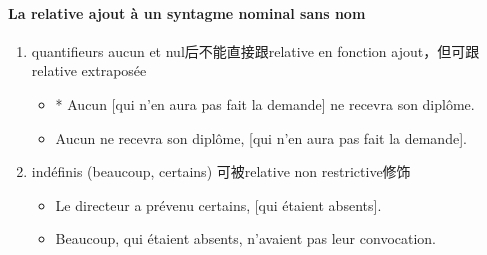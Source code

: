 \documentclass[UTF8]{report}
\begin{document}
\paragraph{La relative ajout à un syntagme nominal sans nom}
\begin{enumerate}
    \item quantifieurs aucun et nul后不能直接跟relative en fonction ajout，但可跟relative extraposée
    \begin{itemize}
        \item * Aucun [qui n’en aura pas fait la demande] ne recevra son diplôme.
        \item Aucun ne recevra son diplôme, [qui n’en aura pas fait la demande].
    \end{itemize}
    \item indéfinis (beaucoup, certains) 可被relative non restrictive修饰
    \begin{itemize}
        \item Le directeur a prévenu certains, [qui étaient absents].
        \item Beaucoup, qui étaient absents, n’avaient pas leur convocation.
    \end{itemize}
\end{enumerate}
\end{document}
